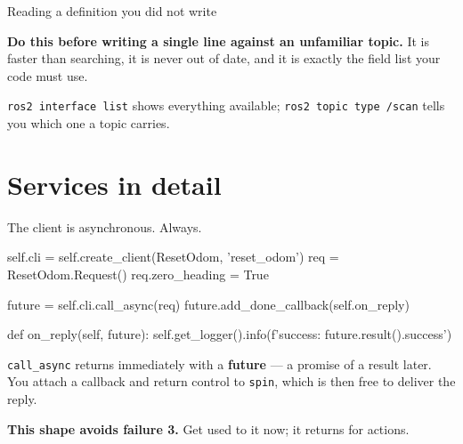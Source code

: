\documentclass[aspectratio=169]{beamer}
\begin{document}
\begin{frame}[fragile]{Reading a definition you did not write}

  \vspace{0.4em}
  \small
  \textbf{Do this before writing a single line against an unfamiliar topic.} It is faster than
  searching, it is never out of date, and it is exactly the field list your code must use.

  \vspace{0.3em}
  \footnotesize
  \texttt{ros2 interface list} shows everything available; \texttt{ros2 topic type /scan} tells
  you which one a topic carries.
\end{frame}

\section{Services in detail}

\begin{frame}[fragile]{The client is asynchronous. Always.}
  \begin{pycodes}
self.cli = self.create_client(ResetOdom, 'reset_odom')
req = ResetOdom.Request()
req.zero_heading = True

future = self.cli.call_async(req)
future.add_done_callback(self.on_reply)

def on_reply(self, future):
    self.get_logger().info(f'success: {future.result().success}')
  \end{pycodes}

  \vspace{0.3em}
  \footnotesize
  \texttt{call\_async} returns immediately with a \textbf{future} --- a promise of a result
  later. You attach a callback and return control to \texttt{spin}, which is then free to
  deliver the reply.

  \vspace{0.2em}
  \textbf{This shape avoids failure 3.} Get used to it now; it returns for actions.
\end{frame}
\end{document}
